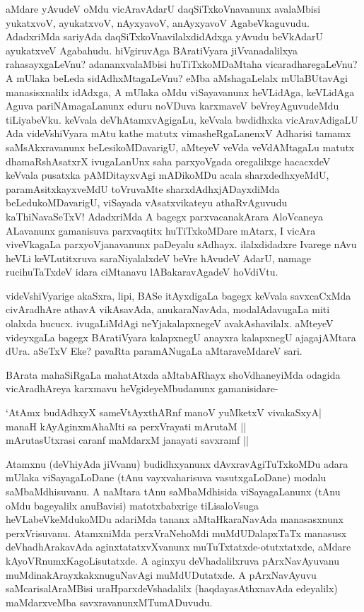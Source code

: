 aMdare yAvudeV oMdu vicAravAdarU daqSiTxkoVnavanunx avalaMbisi yukatxvoV, ayukatxvoV, nAyxyavoV, anAyxyavoV AgabeVkaguvudu. AdadxriMda sariyAda daqSiTxkoVnavilalxdidAdxga yAvudu beVkAdarU ayukatxveV Agabahudu. hiVgiruvAga BAratiVyara jiVvanadalilxya rahasayxgaLeVnu? adananxvalaMbisi huTiTxkoMDaMtaha vicaradharegaLeVnu? A mUlaka beLeda sidAdhxMtagaLeVnu? eMba aMshagaLelalx mUlaBUtavAgi manasisxnalilx idAdxga, A mUlaka oMdu viSayavanunx heVLidAga, keVLidAga Aguva pariNAmagaLanunx eduru noVDuva karxmaveV beVreyAguvudeMdu tiLiyabeVku. keVvala deVhAtamxvAgigaLu, keVvala bwdidhxka vicAravAdigaLU Ada videVshiVyara mAtu kathe matutx vimasheRgaLanenxV Adharisi tamamx saMsAkxravanunx beLesikoMDavarigU, aMteyeV veVda veVdAMtagaLu matutx dhamaRshAsatxrX ivugaLanUnx saha parxyoVgada oregalilxge hacacxdeV keVvala pusatxka pAMDitayxvAgi mADikoMDu acala sharxdedhxyeMdU, paramAsitxkayxveMdU toVruvaMte sharxdAdhxjADayxdiMda beLedukoMDavarigU, viSayada vAsatxvikateyu athaRvAguvudu kaThiNavaSeTxV! AdadxriMda A bagegx parxvacanakArara AloVcaneya ALavanunx gamanisuva parxvaqtitx huTiTxkoMDare mAtarx, I vicAra viveVkagaLa parxyoVjanavanunx paDeyalu sAdhayx. ilalxdidadxre Ivarege nAvu heVLi keVLutitxruva saraNiyalalxdeV beVre hAvudeV AdarU, namage rucihuTaTxdeV idara ciMtanavu lABakaravAgadeV hoVdiVtu.

videVshiVyarige akaSxra, lipi, BASe itAyxdigaLa bagegx keVvala savxcaCxMda civAradhAre athavA vikAsavAda, anukaraNavAda, modalAdavugaLa miti olalxda hucucx. ivugaLiMdAgi neYjakalapxnegeV avakAshavilalx. aMteyeV videyxgaLa bagegx BAratiVyara kalapxnegU anayxra kalapxnegU ajagajAMtara dUra. aSeTxV Eke? pavaRta paramANugaLa aMtaraveMdareV sari.

BArata mahaSiRgaLa mahatAtxda aMtabARhayx shoVdhaneyiMda odagida vicAradhAreya karxmavu heVgideyeMbudanunx gamanisidare-

\begin{shloka}
`AtAmx budAdhxyX sameVtAyxthARnf manoV yuMketxV vivakaSxyA|\\
manaH kAyAginxmAhaMti sa perxVrayati mArutaM ||\\
mArutasUtxrasi caranf maMdarxM janayati savxramf ||
\end{shloka}

Atamxnu (deVhiyAda jiVvanu) budidhxyanunx dAvxravAgiTuTxkoMDu adara mUlaka viSayagaLoDane (tAnu vayxvaharisuva vasutxgaLoDane) modalu saMbaMdhisuvanu. A naMtara tAnu saMbaMdhisida viSayagaLanunx (tAnu oMdu bageyalilx anuBavisi) matotxbabxrige tiLisaloVsuga heVLabeVkeMdukoMDu adariMda tananx aMtaHkaraNavAda manasasxnunx perxVrisuvanu. AtamxniMda perxVraNehoMdi muMdUDalapxTaTx manasusx deVhadhArakavAda aginxtatatxvXvanunx muTuTxtatxde-otutxtatxde, aMdare kAyoVRnumxKagoLisutatxde. A aginxyu deVhadalilxruva pArxNavAyuvanu muMdinakArayxkakxnuguNavAgi muMdUDutatxde. A pArxNavAyuvu saMcarisalAraMBisi uraHparxdeVshadalilx (haqdayasAthxnavAda edeyalilx) maMdarxveMba savxravanunxMTumADuvudu.

